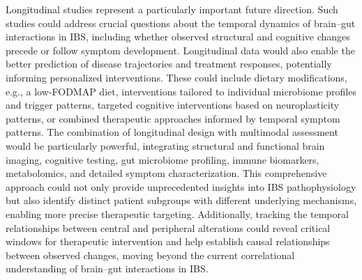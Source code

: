 \documentclass[diagnostics,article,accept,pdftex,moreauthors]{Definitions/mdpi}
\begin{document}
Longitudinal studies represent a particularly important future direction. Such studies could address crucial questions about the temporal dynamics of brain--gut interactions in IBS, including whether observed structural and cognitive changes precede or follow symptom development. Longitudinal data would also enable the better prediction of disease trajectories and treatment responses, potentially informing personalized interventions. These could include dietary modifications, e.g., a low-FODMAP diet, interventions tailored to individual microbiome profiles and trigger patterns, targeted cognitive interventions based on neuroplasticity patterns, or combined therapeutic approaches informed by temporal symptom patterns. The combination of longitudinal design with multimodal assessment would be particularly powerful, integrating structural and functional brain imaging, cognitive testing, gut microbiome profiling, immune biomarkers, metabolomics, and detailed symptom characterization. This comprehensive approach could not only provide unprecedented insights into IBS pathophysiology but also identify distinct patient subgroups with different underlying mechanisms, enabling more precise therapeutic targeting. Additionally, tracking the temporal relationships between central and peripheral alterations could reveal critical windows for therapeutic intervention and help establish causal relationships between observed changes, moving beyond the current correlational understanding of brain--gut interactions in IBS.







\vspace{6pt} 


\end{document}
